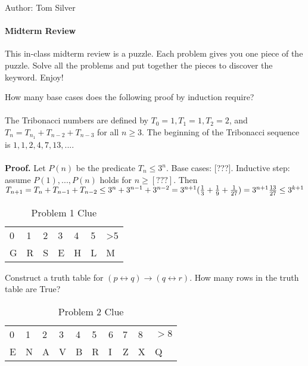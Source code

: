 \documentclass[solution, letterpaper]{cs20inclass}
\begin{document}

\noindent Author: Tom Silver%

\paragraph*{Midterm Review}
This in-class midterm review is a puzzle. Each problem gives you one piece of the puzzle. Solve all the problems and put together the pieces to discover the keyword. Enjoy!

\problem How many base cases does the following proof by induction require?
\\
\\ The Tribonacci numbers are defined by $T_0 = 1, T_1 = 1, T_2 = 2$, and $T_n = T_{n_1} + T_{n-2} + T_{n-3}$ for all $n \ge 3$. The beginning of the Tribonacci sequence is $1, 1, 2, 4, 7, 13, ...$. 
\\
\\ \textbf{Proof.} Let $P(n)$ be the predicate $T_n \le 3^n$. Base cases: [???]. Inductive step: assume $P(1), ..., P(n)$ holds for $n \ge [???]$. Then 
\begin{math}
T_{n+1} = T_n + T_{n-1} + T_{n-2}
\\ \le 3^n + 3^{n-1} + 3^{n-2}
\\ = 3^{n+1}(\frac{1}{3} + \frac{1}{9} + \frac{1}{27})
\\ = 3^{n+1}\frac{13}{27}
\\ \le 3^{k+1}
\end{math} 


\begin{table}[h]
\centering
\begin{tabular}{lllllll}
0 & 1 & 2 & 3 & 4 & 5 & >5 \\
G & R & S & E & H & L & M
\end{tabular}
\caption*{Problem 1 Clue}
\end{table}

\begin{solution}
\end{solution}

\problem Construct a truth table for $(p \leftrightarrow q) \to (q \leftrightarrow r)$. How many rows in the truth table are True?

\begin{table}[h]
\centering
\begin{tabular}{llllllllll}
0 & 1 & 2 & 3 & 4 & 5 & 6 & 7 & 8 & $>8$ \\
E & N & A & V & B & R & I & Z & X & Q            
\end{tabular}
\caption*{Problem 2 Clue}
\end{table}
\end{document}
